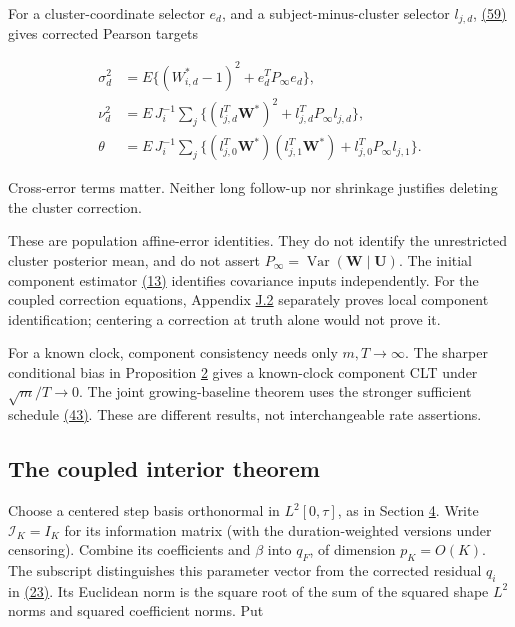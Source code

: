 \documentclass[11pt]{article}
\begin{document}
For a cluster-coordinate selector \(e_d\), and a subject-minus-cluster selector \(l_{j,d}\), \hyperref[eq:59]{(59)} gives corrected Pearson targets

\begin{equation*}
\begin{aligned}
\sigma_d^2&=E\{(W_{i,d}^*-1)^2+e_d^TP_\infty e_d\},\\
\nu_d^2&=E\,J_i^{-1}\sum_j
 \{(l_{j,d}^T\mathbf W^*)^2+l_{j,d}^TP_\infty l_{j,d}\},\\
\theta&=E\,J_i^{-1}\sum_j
 \{(l_{j,0}^T\mathbf W^*)(l_{j,1}^T\mathbf W^*)
       +l_{j,0}^TP_\infty l_{j,1}\}.
\end{aligned}\tag{60}\label{eq:60}
\end{equation*}

Cross-error terms matter. Neither long follow-up nor shrinkage justifies deleting the cluster correction.

These are population affine-error identities. They do not identify the unrestricted cluster posterior mean, and do not assert \(P_\infty=\operatorname{Var}(\mathbf W\mid\mathbf U)\). The initial component estimator \hyperref[eq:13]{(13)} identifies covariance inputs independently. For the coupled correction equations, Appendix \hyperref[sec:J.2]{J.2} separately proves local component identification; centering a correction at truth alone would not prove it.

For a known clock, component consistency needs only \(m,T\to\infty\). The sharper conditional bias in Proposition \hyperref[res:Proposition-2]{2} gives a known-clock component CLT under \(\sqrt m/T\to0\). The joint growing-baseline theorem uses the stronger sufficient schedule \hyperref[eq:43]{(43)}. These are different results, not interchangeable rate assertions.

\subsection{The coupled interior theorem}\label{sec:4.6}

Choose a centered step basis orthonormal in \(L^2[0,\tau]\), as in Section \hyperref[sec:4]{4}. Write \(\mathcal I_K=I_K\) for its information matrix (with the duration-weighted versions under censoring). Combine its coefficients and \(\beta\) into \(q_F\), of dimension \(p_K=O(K)\). The subscript distinguishes this parameter vector from the corrected residual \(q_i\) in \hyperref[eq:23]{(23)}. Its Euclidean norm is the square root of the sum of the squared shape \(L^2\) norms and squared coefficient norms. Put
\end{document}
